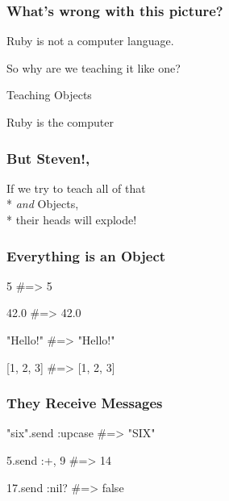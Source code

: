 \documentclass[20pt,aspectratio=169]{beamer}
\begin{document}
\begin{frame}
\frametitle{What's wrong with this picture?}
{
}
\end{frame}

\begin{frame}
\par {Ruby is not a computer language.}
\vspace{4cm}\pause
\par {So why are we teaching it like one?}
\end{frame}

{
\begin{frame}
\par{ Teaching Objects}
\par\vspace{3cm}
\hfill{Ruby is the computer}
\end{frame}
}

\begin{frame}
\frametitle{But Steven!,}
If we try to teach all of that\\* \emph{and} Objects,\\*
their heads will explode!
\end{frame}

\begin{frame}[fragile]
\frametitle{Everything is an Object}
\begin{rubycode}
5 #=> 5

42.0 #=> 42.0

"Hello!" #=> "Hello!"

[1, 2, 3] #=> [1, 2, 3]
\end{rubycode}
\end{frame}

\begin{frame}[fragile]
\frametitle{They  Receive Messages}
\begin{rubycode}
"six".send :upcase
#=> "SIX"

5.send :+, 9
#=> 14

17.send :nil?
#=> false
\end{rubycode}
\end{frame}
\end{document}
